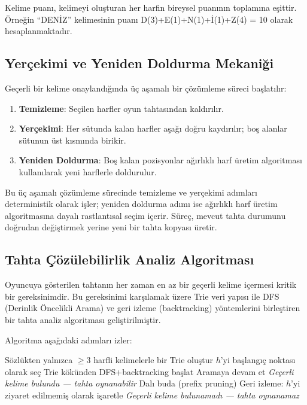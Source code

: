 \documentclass[conference]{IEEEtran}
\begin{document}
Kelime puanı, kelimeyi oluşturan her harfin bireysel puanının toplamına eşittir. Örneğin ``DENİZ'' kelimesinin puanı D(3)+E(1)+N(1)+İ(1)+Z(4) = 10 olarak hesaplanmaktadır.

\subsection{Yerçekimi ve Yeniden Doldurma Mekaniği}

Geçerli bir kelime onaylandığında üç aşamalı bir çözümleme süreci başlatılır:

\begin{enumerate}
  \item \textbf{Temizleme}: Seçilen harfler oyun tahtasından kaldırılır.
  \item \textbf{Yerçekimi}: Her sütunda kalan harfler aşağı doğru kaydırılır; boş alanlar sütunun üst kısmında birikir.
  \item \textbf{Yeniden Doldurma}: Boş kalan pozisyonlar ağırlıklı harf üretim algoritması kullanılarak yeni harflerle doldurulur.
\end{enumerate}

Bu üç aşamalı çözümleme sürecinde temizleme ve yerçekimi adımları deterministik olarak işler; yeniden doldurma adımı ise ağırlıklı harf üretim algoritmasına dayalı rastlantısal seçim içerir. Süreç, mevcut tahta durumunu doğrudan değiştirmek yerine yeni bir tahta kopyası üretir.

\subsection{Tahta Çözülebilirlik Analiz Algoritması}

Oyuncuya gösterilen tahtanın her zaman en az bir geçerli kelime içermesi kritik bir gereksinimdir. Bu gereksinimi karşılamak üzere Trie veri yapısı \cite{trie_data_structure} ile DFS (Derinlik Öncelikli Arama) ve geri izleme (backtracking) \cite{dfs_backtracking} yöntemlerini birleştiren bir tahta analiz algoritması geliştirilmiştir.

Algoritma aşağıdaki adımları izler:

\begin{algorithm}[H]
\caption{Tahta Çözülebilirlik Analizi}
\begin{algorithmic}[1]
\STATE Sözlükten yalnızca $\geq$3 harfli kelimelerle bir Trie oluştur
  \STATE $h$'yi başlangıç noktası olarak seç
  \STATE Trie kökünden DFS+backtracking başlat
      \STATE Aramaya devam et
        \RETURN \textit{Geçerli kelime bulundu --- tahta oynanabilir}
      \ENDIF
    \ELSE
      \STATE Dalı buda (prefix pruning)
    \ENDIF
  \ENDFOR
  \STATE Geri izleme: $h$'yi ziyaret edilmemiş olarak işaretle
\ENDFOR
\RETURN \textit{Geçerli kelime bulunamadı --- tahta oynanamaz}
\end{algorithmic}
\end{algorithm}
\end{document}
